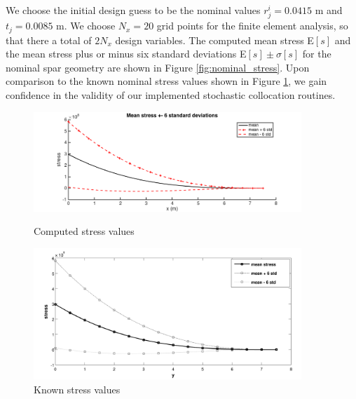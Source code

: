 \documentclass[10pt]{article}
\begin{document}
We choose the initial design guess to be the nominal
values $r^i_j = 0.0415$ m and $t_j = 0.0085$ m.
We choose $N_x = 20$ grid points for the finite
element analysis, so that there a total of $2 N_x$
design variables.
The computed mean stress E$[s]$ and the mean
stress plus or minus six standard deviations
E$[s] \pm \sigma[s]$ for the nominal spar
geometry are shown in Figure \ref{fig:nominal_stress}.
Upon comparison to the known nominal stress values
shown in Figure \ref{fig:nominal_stress_hicken},
we gain confidence in the validity of our implemented
stochastic collocation routines.
%
\begin{figure}[hbt!]
\centering
\begin{minipage}[b]{0.55\textwidth}
\includegraphics[width=0.9\textwidth]{nominal_stress}
\caption{Computed stress values}
\label{fig:nominal_stress}
\end{minipage}%
\begin{minipage}[b]{0.45\textwidth}
\includegraphics[width=0.9\textwidth]{nominal_stress_hicken}
\caption{Known stress values}
\label{fig:nominal_stress_hicken}
\end{minipage}
\end{figure}
\end{document}
